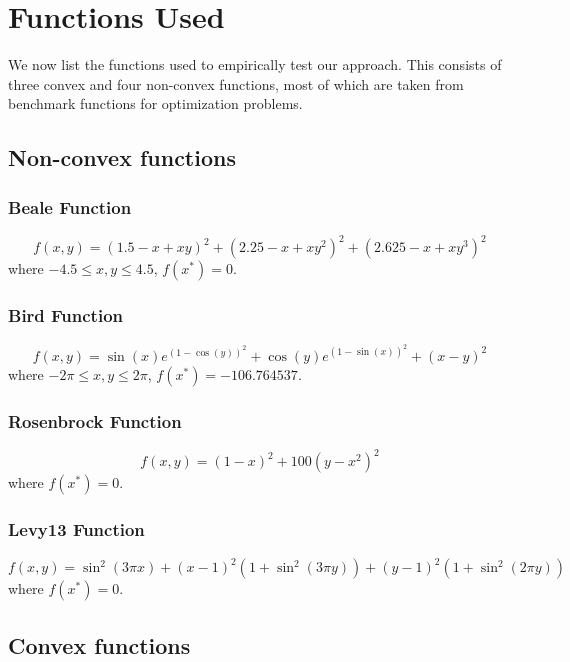 \documentclass{article}
\begin{document}
\section{Functions Used}\label{functions}
We now list the functions used to empirically test our approach. This consists of three convex and four non-convex functions, most of which are taken from benchmark functions for optimization problems.

\subsection{Non-convex functions}

\subsubsection{Beale Function}
\begin{equation}
f(x,y) = (1.5 - x + xy)^2 + (2.25 - x + xy^2)^2 + (2.625 - x + xy^3)^2	
\end{equation}
where $-4.5\le x,y \le 4.5$, $f(x^*)=0$.

\subsubsection{Bird Function}
\begin{equation}
f(x,y) = \sin(x)e^{(1-\cos(y))^2} + \cos(y)e^{(1-\sin(x))^2} + (x-y)^2
\end{equation}
where $-2\pi \le x,y \le 2\pi$, $f(x^*)=-106.764537$.

\subsubsection{Rosenbrock Function}
\begin{equation}
f(x,y) = (1-x)^2 + 100(y-x^2)^2
\end{equation}
where $f(x^*)=0$.

\subsubsection{Levy13 Function}
\begin{equation}
f(x,y) = \sin^2(3\pi x) + (x-1)^2\left(1+\sin^2(3\pi y)\right) + (y-1)^2\left(1+\sin^2(2\pi y)\right)
\end{equation}
where $f(x^*)=0$.

\subsection{Convex functions}
\end{document}
